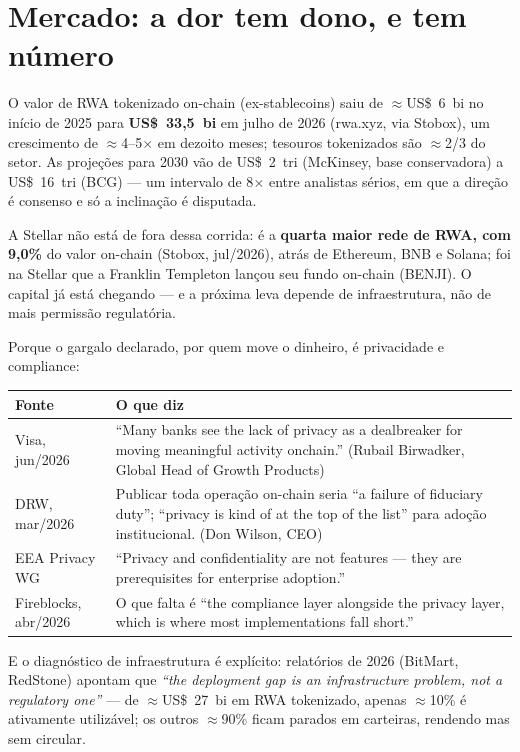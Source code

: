 \documentclass[11pt]{article}
\begin{document}
\section{Mercado: a dor tem dono, e tem número}

O valor de RWA tokenizado on-chain (ex-stablecoins) saiu de $\approx$US\$~6~bi no
início de 2025 para \textbf{US\$~33,5~bi} em julho de 2026 (rwa.xyz, via Stobox),
um crescimento de $\approx$4--5$\times$ em dezoito meses; tesouros tokenizados são
$\approx$2/3 do setor. As projeções para 2030 vão de US\$~2~tri (McKinsey, base
conservadora) a US\$~16~tri (BCG) --- um intervalo de 8$\times$ entre analistas
sérios, em que a direção é consenso e só a inclinação é disputada.

A Stellar não está de fora dessa corrida: é a \textbf{quarta maior rede de RWA,
com 9,0\%} do valor on-chain (Stobox, jul/2026), atrás de Ethereum, BNB e Solana;
foi na Stellar que a Franklin Templeton lançou seu fundo on-chain (BENJI). O
capital já está chegando --- e a próxima leva depende de infraestrutura, não de
mais permissão regulatória.

Porque o gargalo declarado, por quem move o dinheiro, é privacidade e compliance:

\begin{center}
\small
\begin{tabular}{@{}p{3.6cm}p{9.6cm}@{}}
\toprule
\textbf{Fonte} & \textbf{O que diz} \\
\midrule
Visa, jun/2026 & ``Many banks see the lack of privacy as a dealbreaker for moving
meaningful activity onchain.'' (Rubail Birwadker, Global Head of Growth Products) \\
\addlinespace
DRW, mar/2026 & Publicar toda operação on-chain seria ``a failure of fiduciary
duty''; ``privacy is kind of at the top of the list'' para adoção institucional.
(Don Wilson, CEO) \\
\addlinespace
EEA Privacy WG & ``Privacy and confidentiality are not features --- they are
prerequisites for enterprise adoption.'' \\
\addlinespace
Fireblocks, abr/2026 & O que falta é ``the compliance layer alongside the privacy
layer, which is where most implementations fall short.'' \\
\bottomrule
\end{tabular}
\end{center}

E o diagnóstico de infraestrutura é explícito: relatórios de 2026 (BitMart,
RedStone) apontam que \emph{``the deployment gap is an infrastructure problem, not
a regulatory one''} --- de $\approx$US\$~27~bi em RWA tokenizado, apenas
$\approx$10\% é ativamente utilizável; os outros $\approx$90\% ficam parados em
carteiras, rendendo mas sem circular.
\end{document}
